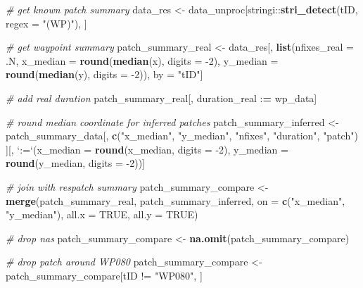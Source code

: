 \documentclass[]{scrartcl}
\newenvironment{Shaded}{}{}
\newcommand{\CommentTok}[1]{\textcolor[rgb]{0.38,0.63,0.69}{\textit{#1}}}
\newcommand{\DataTypeTok}[1]{\textcolor[rgb]{0.56,0.13,0.00}{#1}}
\newcommand{\DecValTok}[1]{\textcolor[rgb]{0.25,0.63,0.44}{#1}}
\newcommand{\ErrorTok}[1]{\textcolor[rgb]{1.00,0.00,0.00}{\textbf{#1}}}
\newcommand{\KeywordTok}[1]{\textcolor[rgb]{0.00,0.44,0.13}{\textbf{#1}}}
\newcommand{\NormalTok}[1]{#1}
\newcommand{\OperatorTok}[1]{\textcolor[rgb]{0.40,0.40,0.40}{#1}}
\newcommand{\OtherTok}[1]{\textcolor[rgb]{0.00,0.44,0.13}{#1}}
\newcommand{\StringTok}[1]{\textcolor[rgb]{0.25,0.44,0.63}{#1}}
\begin{document}
\begin{Shaded}
\begin{Highlighting}[]
\CommentTok{# get known patch summary}
\NormalTok{data_res <-}\StringTok{ }\NormalTok{data_unproc[stringi}\OperatorTok{::}\KeywordTok{stri_detect}\NormalTok{(tID, }\DataTypeTok{regex =} \StringTok{"(WP)"}\NormalTok{), ]}

\CommentTok{# get waypoint summary}
\NormalTok{patch_summary_real <-}\StringTok{ }\NormalTok{data_res[, }\KeywordTok{list}\NormalTok{(}\DataTypeTok{nfixes_real =}\NormalTok{ .N,}
                                      \DataTypeTok{x_median =} \KeywordTok{round}\NormalTok{(}\KeywordTok{median}\NormalTok{(x), }\DataTypeTok{digits =} \DecValTok{-2}\NormalTok{),}
                                      \DataTypeTok{y_median =} \KeywordTok{round}\NormalTok{(}\KeywordTok{median}\NormalTok{(y), }\DataTypeTok{digits =} \DecValTok{-2}\NormalTok{)), }
\NormalTok{                               by =}\StringTok{ "tID"}\NormalTok{]}

\CommentTok{# add real duration}
\NormalTok{patch_summary_real[, duration_real }\OperatorTok{:}\ErrorTok{=}\StringTok{ }\NormalTok{wp_data]}

\CommentTok{# round median coordinate for inferred patches}
\NormalTok{patch_summary_inferred <-}\StringTok{ }
\StringTok{  }\NormalTok{patch_summary_data[, }
                     \KeywordTok{c}\NormalTok{(}\StringTok{"x_median"}\NormalTok{, }\StringTok{"y_median"}\NormalTok{, }
                       \StringTok{"nfixes"}\NormalTok{, }\StringTok{"duration"}\NormalTok{, }\StringTok{"patch"}\NormalTok{)}
\NormalTok{                     ][, }\StringTok{`}\DataTypeTok{:=}\StringTok{`}\NormalTok{(}\DataTypeTok{x_median =} \KeywordTok{round}\NormalTok{(x_median, }\DataTypeTok{digits =} \DecValTok{-2}\NormalTok{),}
                              \DataTypeTok{y_median =} \KeywordTok{round}\NormalTok{(y_median, }\DataTypeTok{digits =} \DecValTok{-2}\NormalTok{))]}

\CommentTok{# join with respatch summary}
\NormalTok{patch_summary_compare <-}\StringTok{ }
\StringTok{  }\KeywordTok{merge}\NormalTok{(patch_summary_real,}
\NormalTok{        patch_summary_inferred, }
        \DataTypeTok{on =} \KeywordTok{c}\NormalTok{(}\StringTok{"x_median"}\NormalTok{, }\StringTok{"y_median"}\NormalTok{),}
        \DataTypeTok{all.x =} \OtherTok{TRUE}\NormalTok{, }\DataTypeTok{all.y =} \OtherTok{TRUE}\NormalTok{)}

\CommentTok{# drop nas}
\NormalTok{patch_summary_compare <-}\StringTok{ }\KeywordTok{na.omit}\NormalTok{(patch_summary_compare)}

\CommentTok{# drop patch around WP080}
\NormalTok{patch_summary_compare <-}\StringTok{ }\NormalTok{patch_summary_compare[tID }\OperatorTok{!=}\StringTok{ "WP080"}\NormalTok{, ]}
\end{Highlighting}
\end{Shaded}
\end{document}
